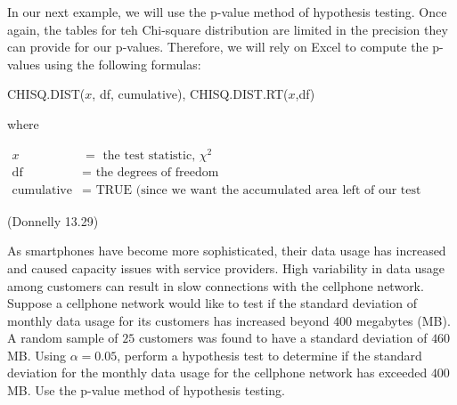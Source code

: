 \documentclass[12pt, letterpaper]{article}
\newcounter{exercise}
\theoremstyle{definition}
\begin{document}
\newpage


\begin{statement}

In our next example, we will use the p-value method of hypothesis testing.  Once again, the tables for teh Chi-square distribution are limited in the precision they can provide for our p-values.  Therefore, we will rely on Excel to compute the p-values using the following formulas:
\begin{center}
CHISQ.DIST($x$, df, cumulative), CHISQ.DIST.RT($x$,df)
\end{center}

where

\begin{align*}
x &= \text{ the test statistic, }\chi^2\\
\text{df}&= \text{ the degrees of freedom}\\
\text{cumulative} &= \text{ TRUE (since we want the accumulated area left of our test statistic)}
\end{align*}

\end{statement}


\begin{exercise}  (Donnelly 13.29)

As smartphones have become more sophisticated, their data usage has increased and caused capacity issues with service providers.  High variability in data usage among customers can result in slow connections with the cellphone network.  Suppose a cellphone network would like to test if the standard deviation of monthly data usage for its customers has increased beyond $400$ megabytes (MB).  A random sample of $25$ customers was found to have a standard deviation of $460$ MB.  Using $\alpha = 0.05$, perform a hypothesis test to determine if the standard deviation for the monthly data usage for the cellphone network has exceeded $400$ MB.  Use the p-value method of hypothesis testing.

\end{exercise}

\vfill

\newpage
\end{document}
